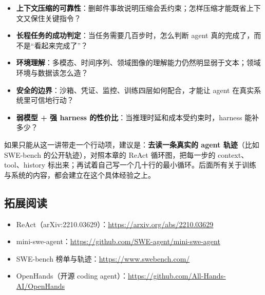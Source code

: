 \documentclass[a4paper]{article}
\begin{document}
\begin{itemize}
\item \textbf{上下文压缩的可靠性}：删邮件事故说明压缩会丢约束；怎样压缩才能既省上下文又保住关键指令？
\item \textbf{长程任务的成功判定}：当任务需要几百步时，怎么判断 agent 真的完成了，而不是“看起来完成了”？
\item \textbf{环境理解}：多模态、时间序列、领域图像的理解能力仍然明显弱于文本；领域环境与数据该怎么造？
\item \textbf{安全的边界}：沙箱、凭证、监控、训练四层如何配合，才能让 agent 在真实系统里可信地行动？
\item \textbf{弱模型 + 强 harness 的性价比}：当推理时延和成本受约束时，harness 能补多少？
\end{itemize}

如果只能从这一讲带走一个行动项，建议是：\textbf{去读一条真实的 agent 轨迹}（比如 SWE-bench 的公开轨迹），对照本章的 ReAct 循环图，把每一步的 context、tool、history 标出来；再试着自己写一个几十行的最小循环。后面所有关于训练与系统的内容，都会建立在这个具体经验之上。

\subsection{拓展阅读}

\begin{itemize}
\item ReAct（arXiv:2210.03629）：\url{https://arxiv.org/abs/2210.03629}
\item mini-swe-agent：\url{https://github.com/SWE-agent/mini-swe-agent}
\item SWE-bench 榜单与轨迹：\url{https://www.swebench.com/}
\item OpenHands（开源 coding agent）：\url{https://github.com/All-Hands-AI/OpenHands}
\end{itemize}

\end{document}
